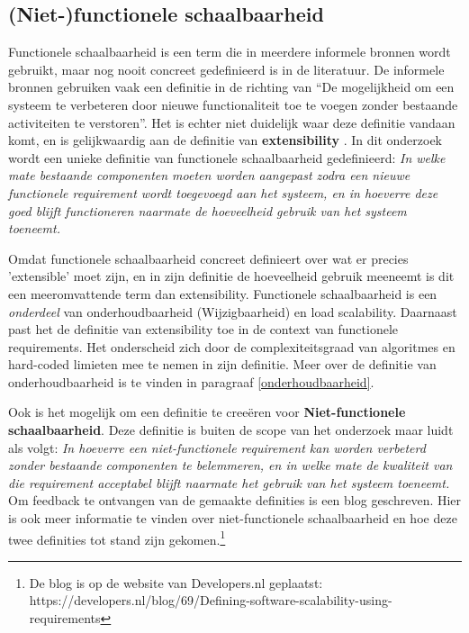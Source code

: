 \subsection{(Niet-)functionele schaalbaarheid} \label{FunctioneleSchaalbaarheid}
Functionele schaalbaarheid is een term die in meerdere informele bronnen wordt gebruikt, maar nog nooit concreet gedefinieerd is in de literatuur. De informele bronnen gebruiken vaak een definitie in de richting van \enquote{De mogelijkheid om een systeem te verbeteren door nieuwe functionaliteit toe te voegen zonder bestaande activiteiten te verstoren}. Het is echter niet duidelijk waar deze definitie vandaan komt, en is gelijkwaardig aan de definitie van \textbf{extensibility} \parencite{Extensibility, DesigningExtensibility}. In dit onderzoek wordt een unieke definitie van functionele schaalbaarheid gedefinieerd: \textit{In welke mate bestaande componenten moeten worden aangepast zodra een nieuwe functionele requirement wordt toegevoegd aan het systeem, en in hoeverre deze goed blijft functioneren naarmate de hoeveelheid gebruik van het systeem toeneemt.} 

Omdat functionele schaalbaarheid concreet definieert over wat er precies 'extensible' moet zijn, en in zijn definitie de hoeveelheid gebruik meeneemt is dit een meeromvattende term dan extensibility. Functionele schaalbaarheid is een \textit{onderdeel} van onderhoudbaarheid (Wijzigbaarheid) en load scalability. Daarnaast past het de definitie van extensibility toe in de context van functionele requirements. Het onderscheid zich door de complexiteitsgraad van algoritmes en hard-coded limieten mee te nemen in zijn definitie. Meer over de definitie van onderhoudbaarheid is te vinden in paragraaf \ref{onderhoudbaarheid}.

Ook is het mogelijk om een definitie te creeëren voor \textbf{Niet-functionele schaalbaarheid}. Deze definitie is buiten de scope van het onderzoek maar luidt als volgt:
\textit{In hoeverre een niet-functionele requirement kan worden verbeterd zonder bestaande componenten te belemmeren, en in welke mate de kwaliteit van die requirement acceptabel blijft naarmate het gebruik van het systeem toeneemt.} Om feedback te ontvangen van de gemaakte definities is een blog geschreven. Hier is ook meer informatie te vinden over niet-functionele schaalbaarheid en hoe deze twee definities tot stand zijn gekomen.\footnote{De blog is op de website van Developers.nl geplaatst: https://developers.nl/blog/69/Defining-software-scalability-using-requirements}

